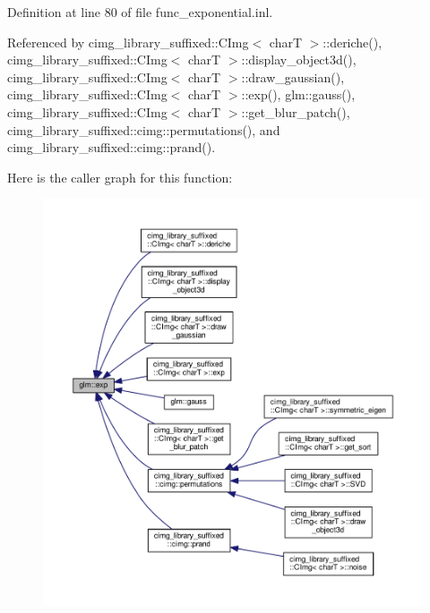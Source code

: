 Definition at line 80 of file func\+\_\+exponential.\+inl.



Referenced by cimg\+\_\+library\+\_\+suffixed\+::\+C\+Img$<$ char\+T $>$\+::deriche(), cimg\+\_\+library\+\_\+suffixed\+::\+C\+Img$<$ char\+T $>$\+::display\+\_\+object3d(), cimg\+\_\+library\+\_\+suffixed\+::\+C\+Img$<$ char\+T $>$\+::draw\+\_\+gaussian(), cimg\+\_\+library\+\_\+suffixed\+::\+C\+Img$<$ char\+T $>$\+::exp(), glm\+::gauss(), cimg\+\_\+library\+\_\+suffixed\+::\+C\+Img$<$ char\+T $>$\+::get\+\_\+blur\+\_\+patch(), cimg\+\_\+library\+\_\+suffixed\+::cimg\+::permutations(), and cimg\+\_\+library\+\_\+suffixed\+::cimg\+::prand().

Here is the caller graph for this function\+:
\nopagebreak
\begin{figure}[H]
\begin{center}
\leavevmode
\includegraphics[width=350pt]{df/d74/group__core__func__exponential_ga071566cadc7505455e611f2a0353f4d4_icgraph}
\end{center}
\end{figure}
\mbox{\label{group__core__func__exponential_gaff17ace6b579a03bf223ed4d1ed2cd16}} 
